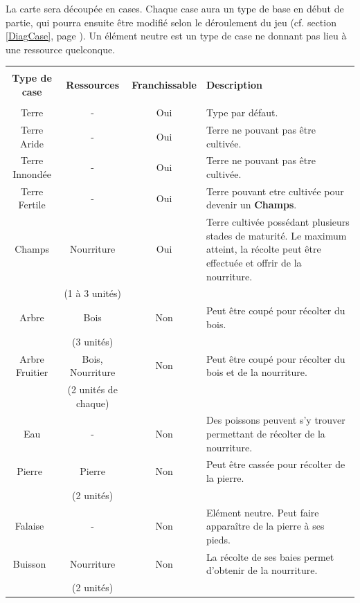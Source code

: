 \documentclass[a4paper]{article}
\newcommand{\alinea}{\hspace*{0.5cm}}
\begin{document}
      \alinea La carte sera découpée en cases. Chaque case aura un type de base en début de partie, qui pourra ensuite être modifié selon le déroulement du jeu (cf. section \ref{DiagCase}, page \pageref{DiagCase}). Un élément neutre est un type de case ne donnant pas lieu à une ressource quelconque.\\
      \newline
      \label{TabCase}
      \begin{small}
        \begin{tabular}{| c | c | c |p{5cm}|}
          \hline
          &  &  &  \\
          \textbf{Type de case} & \textbf{Ressources} & \textbf{Franchissable} & \textbf{Description}\\
          &  &  &  \\
          \hline
          Terre & - & Oui & Type par défaut.\\
          \hline
          Terre Aride & - & Oui & Terre ne pouvant pas être cultivée.\\
          \hline
          Terre Innondée & - & Oui & Terre ne pouvant pas être cultivée.\\
          \hline
          Terre Fertile & - & Oui & Terre pouvant etre cultivée pour devenir un \textbf{Champs}.\\
          \hline
          Champs & Nourriture & Oui & Terre cultivée possédant plusieurs stades de maturité. Le maximum atteint, la récolte peut être effectuée et offrir de la nourriture.\\
          & (1 à 3 unités) &  &  \\
          \hline
          Arbre & Bois & Non & Peut être coupé pour récolter du bois.\\
          & (3 unités) &  &  \\
          \hline
          Arbre Fruitier & Bois, Nourriture & Non & Peut être coupé pour récolter du bois et de la nourriture.\\
          & (2 unités de chaque) &  &  \\
          \hline
          Eau & - & Non & Des poissons peuvent s'y trouver permettant de récolter de la nourriture.\\
          \hline
          Pierre & Pierre & Non & Peut être cassée pour récolter de la pierre.\\
          & (2 unités) &  &  \\
          \hline
          Falaise & - & Non & Elément neutre. Peut faire apparaître de la pierre à ses pieds.\\
          \hline
          Buisson & Nourriture & Non & La récolte de ses baies permet d'obtenir de la nourriture.\\
          & (2 unités) &  &  \\
          \hline
        \end{tabular}
      \end{small}
    
\end{document}
